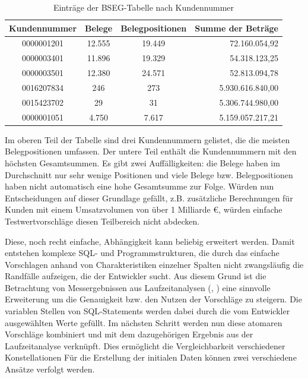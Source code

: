 \begin{table}[ht!]
	\centering
	\begin{tabular}{ |c|c|c|r| }
		\hline
		Kundennummer & Belege & Belegpositionen & Summe der Beträge\\
		\hline
		0000001201 & 12.555 & 19.449 & 72.160.054,92 \\
		0000003401 & 11.896 & 19.329 & 54.318.123,25 \\
		0000003501 & 12.380 & 24.571 & 52.813.094,78 \\
		\hline
		0016207834 & 246 & 273 & 5.930.616.840,00 \\
		0015423702 & 29 & 31 & 5.306.744.980,00 \\
		0000001051 & 4.750 & 7.617 & 5.159.057.217,21 \\
		\hline
	\end{tabular}
	\caption{Einträge der BSEG-Tabelle nach Kundennummer}
	\label{tab:vergleichkonstellationen}
\end{table}

Im oberen Teil der Tabelle sind drei Kundennummern gelistet, die die meisten Belegpositionen umfassen.
Der untere Teil enthält die Kundennummern mit den höchsten Gesamtsummen.
Es gibt zwei Auffälligkeiten: die Belege haben im Durchschnitt nur sehr wenige Positionen und viele Belege bzw. Belegpositionen haben nicht automatisch eine hohe Gesamtsumme zur Folge.
Würden nun Entscheidungen auf dieser Grundlage gefällt, z.B. zusätzliche Berechnungen für Kunden mit einem Umsatzvolumen von über 1 Milliarde €, würden einfache Testwertvorschläge diesen Teilbereich nicht abdecken.

Diese, noch recht einfache, Abhängigkeit kann beliebig erweitert werden.
Damit entstehen komplexe SQL- und Programmstrukturen, die durch das einfache Vorschlagen anhand von Charakteristiken einzelner Spalten nicht zwangsläufig die Randfälle aufzeigen, die der Entwickler sucht.
Aus diesem Grund ist die Betrachtung von Messergebnissen aus Laufzeitanalysen (\cite{Exner2014}, \cite{Mues2014}) eine sinnvolle Erweiterung um die Genauigkeit bzw. den Nutzen der Vorschläge zu steigern.
Die variablen Stellen von SQL-Statements werden dabei durch die vom Entwickler ausgewählten Werte gefüllt.
Im nächsten Schritt werden nun diese atomaren Vorschläge kombiniert und mit dem dazugehörigen Ergebnis aus der Laufzeitanalyse verknüpft.
Dies ermöglicht die Vergleichbarkeit verschiedener Konstellationen
Für die Erstellung der initialen Daten können zwei verschiedene Ansätze verfolgt werden.

